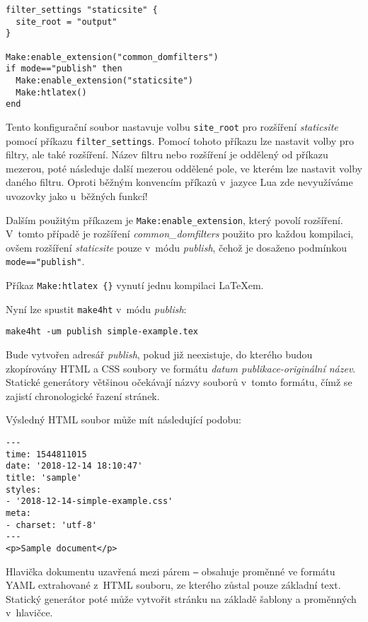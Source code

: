 \documentclass{csbulletin}
\newcommand\nazev[1]{\textit{#1}}
\newcommand\prikaz[1]{\texttt{#1}}
\begin{document}
\begin{verbatim}
filter_settings "staticsite" {
  site_root = "output" 
}

Make:enable_extension("common_domfilters")
if mode=="publish" then
  Make:enable_extension("staticsite")
  Make:htlatex()
end

\end{verbatim}

Tento konfigurační soubor nastavuje volbu \texttt{site\_root} pro rozšíření
\nazev{staticsite} pomocí příkazu \verb|filter_settings|. Pomocí tohoto příkazu
lze nastavit volby pro filtry, ale také rozšíření. Název filtru nebo rozšíření
je oddělený od příkazu mezerou, poté následuje další mezerou oddělené pole, ve
kterém lze nastavit volby daného filtru. Oproti běžným konvencím příkazů
v~jazyce Lua zde nevyužíváme uvozovky jako u~běžných funkcí!

Dalším použitým příkazem je \verb|Make:enable_extension|, který povolí
rozšíření. V~tomto případě je rozšíření \nazev{common\_domfilters} použito pro
každou kompilaci, ovšem rozšíření \nazev{staticsite} pouze v~módu
\nazev{publish}, čehož je dosaženo podmínkou \verb|mode=="publish"|.

Příkaz \verb|Make:htlatex {}| vynutí jednu kompilaci \LaTeX em. 

Nyní lze spustit \prikaz{make4ht} v~módu \nazev{publish}: 

\begin{verbatim}
make4ht -um publish simple-example.tex
\end{verbatim}

Bude vytvořen adresář \nazev{publish}, pokud již neexistuje, do kterého budou
zkopírovány HTML a CSS soubory ve formátu \textit{datum publikace-originální
název}. Statické generátory většinou očekávají názvy souborů v~tomto formátu,
čímž se zajistí chronologické řazení stránek.

Výsledný HTML soubor může mít následující podobu:

\begin{verbatim}
---
time: 1544811015
date: '2018-12-14 18:10:47'
title: 'sample'
styles:
- '2018-12-14-simple-example.css'
meta:
- charset: 'utf-8'
---
<p>Sample document</p>
\end{verbatim}


Hlavička dokumentu uzavřená mezi párem \texttt{---} obsahuje proměnné ve
formátu YAML extrahované z~HTML souboru, ze kterého zůstal pouze základní text.
Statický generátor poté může vytvořit stránku na základě šablony a proměnných
v~hlavičce. 
\end{document}
